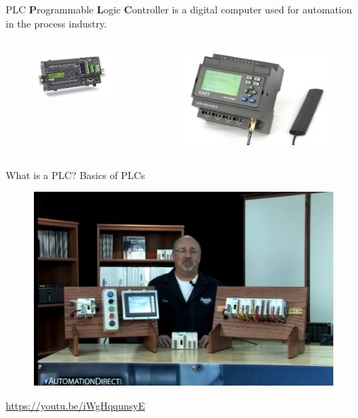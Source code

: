 \begin{frame}{PLC}
	\textbf{P}rogrammable \textbf{L}ogic \textbf{C}ontroller is a digital computer used for automation in the process industry. 
	\begin{columns}
		\begin{column}{0.5\textwidth}
			\begin{figure}
				\centering
				\includegraphics[width=0.7\linewidth]{img/PLC_1}
			\end{figure}

		\end{column}
		\begin{column}{0.5\textwidth}
\begin{figure}
\centering
\includegraphics[width=0.7\linewidth]{img/PLC_2}

\end{figure}

		\end{column}
	\end{columns}
	
\end{frame}
\begin{frame}{What is a PLC? Basics of PLCs}
	\begin{figure}
\centering
\includegraphics[width=0.7\linewidth]{img/what_is_a_plc}
\end{figure}

	\url{https://youtu.be/iWgHqqunsyE}
\end{frame}
